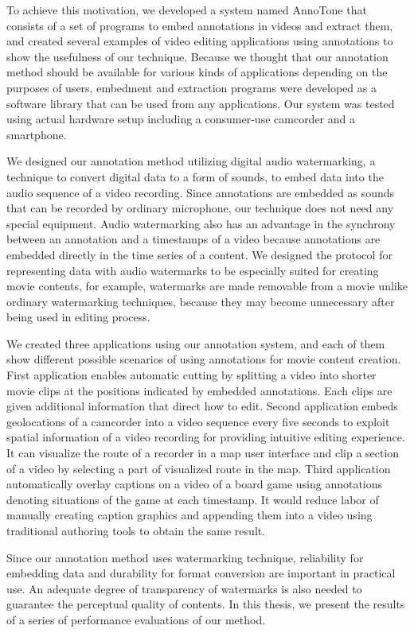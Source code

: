 To achieve this motivation, we developed a system named AnnoTone that consists of a set of programs to embed annotations in videos and extract them, and created several examples of video editing applications using annotations to show the usefulness of our technique.
Because we thought that our annotation method should be available for various kinds of applications depending on the purposes of users, embedment and extraction programs were developed as a software library that can be used from any applications.
Our system was tested using actual hardware setup including a consumer-use camcorder and a smartphone. %

We designed our annotation method utilizing digital audio watermarking, a technique to convert digital data to a form of sounds, to embed data into the audio sequence of a video recording.
Since annotations are embedded as sounds that can be recorded by ordinary microphone, our technique does not need any special equipment.
Audio watermarking also has an advantage in the synchrony between an annotation and a timestamps of a video because annotations are embedded directly in the time series of a content.
We designed the protocol for representing data with audio watermarks to be especially suited for creating movie contents, for example, watermarks are made removable from a movie unlike ordinary watermarking techniques, because they may become unnecessary after being used in editing process.

We created three applications using our annotation system, and each of them show different possible scenarios of using annotations for movie content creation.
First application enables automatic cutting by splitting a video into shorter movie clips at the positions indicated by embedded annotations.
Each clips are given additional information that direct how to edit.
Second application embeds geolocations of a camcorder into a video sequence every five seconds to exploit spatial information of a video recording for providing intuitive editing experience.
It can visualize the route of a recorder in a map user interface and clip a section of a video by selecting a part of visualized route in the map.
Third application automatically overlay captions on a video of a board game using annotations denoting situations of the game at each timestamp.
It would reduce labor of manually creating caption graphics and appending them into a video using traditional authoring tools to obtain the same result.

Since our annotation method uses watermarking technique, reliability for embedding data and durability for format conversion are important in practical use.
An adequate degree of transparency of watermarks is also needed to guarantee the perceptual quality of contents.
In this thesis, we present the results of a series of performance evaluations of our method.
